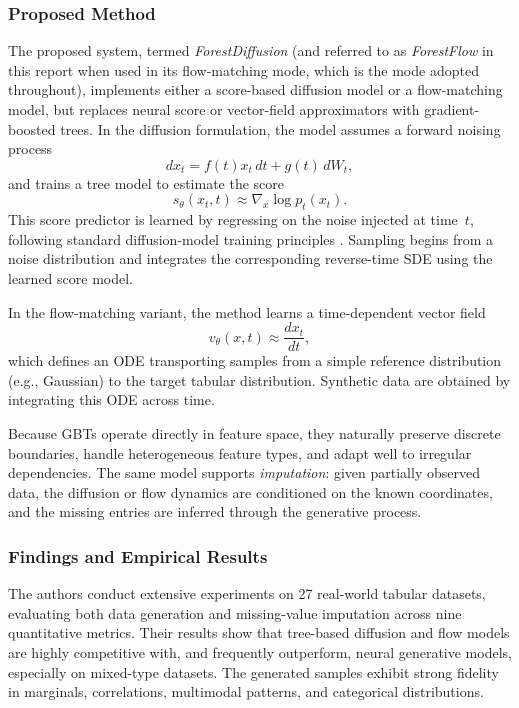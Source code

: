 \subsubsection{Proposed Method}
The proposed system, termed \textit{ForestDiffusion} (and referred to as \textit{ForestFlow} in this report when used in its flow-matching mode, which is the mode adopted throughout), implements either a score-based diffusion model or a flow-matching model, but replaces neural score or vector-field approximators with gradient-boosted trees. In the diffusion formulation, the model assumes a forward noising process
\begin{equation}
    dx_t = f(t) x_t \, dt + g(t) \, dW_t,
\end{equation}
and trains a tree model to estimate the score
\begin{equation}
    s_\theta(x_t, t) \approx \nabla_x \log p_t(x_t).
\end{equation}
This score predictor is learned by regressing on the noise injected at time~$t$, following standard diffusion-model training principles \cite{song2021scoresde}. Sampling begins from a noise distribution and integrates the corresponding reverse-time SDE using the learned score model.

In the flow-matching variant, the method learns a time-dependent vector field
\begin{equation}
    v_\theta(x, t) \approx \frac{d x_t}{dt},
\end{equation}
which defines an ODE transporting samples from a simple reference distribution (e.g., Gaussian) to the target tabular distribution. Synthetic data are obtained by integrating this ODE across time.

Because GBTs operate directly in feature space, they naturally preserve discrete boundaries, handle heterogeneous feature types, and adapt well to irregular dependencies. The same model supports \textit{imputation}: given partially observed data, the diffusion or flow dynamics are conditioned on the known coordinates, and the missing entries are inferred through the generative process.

\subsubsection{Findings and Empirical Results}
The authors conduct extensive experiments on 27 real-world tabular datasets, evaluating both data generation and missing-value imputation across nine quantitative metrics. Their results show that tree-based diffusion and flow models are highly competitive with, and frequently outperform, neural generative models, especially on mixed-type datasets. The generated samples exhibit strong fidelity in marginals, correlations, multimodal patterns, and categorical distributions.

